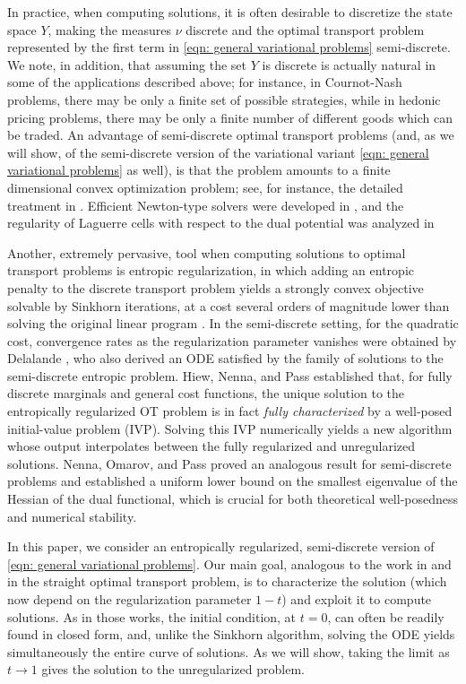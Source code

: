 \documentclass{scrartcl}
\theoremstyle{plain}
\theoremstyle{definition}
\begin{document}
In practice, when computing solutions, it is often desirable to discretize the state space $Y$, making the measures $\nu$ discrete and the optimal transport problem represented by the first term in \eqref{eqn: general variational problems} semi-discrete.  We note, in addition, that assuming the set $Y$ is discrete is actually natural in some of the applications described above; for instance, in Cournot-Nash problems, there may be only a finite set of possible strategies, while in hedonic pricing problems, there may be only a finite number of different goods which can be traded.  An advantage of semi-discrete optimal transport problems (and, as we will show, of the semi-discrete version of the variational variant \eqref{eqn: general variational problems} as well), is that the problem amounts to a finite dimensional convex optimization problem; see, for instance, the detailed treatment in \cite{MerigotThibert2021}. Efficient Newton-type solvers were developed in \cite{kitagawa2019convergence,levy2015numerical}, and the regularity of Laguerre cells with respect to the dual potential was analyzed in \cite{de2019differentiation}

Another, extremely pervasive,  tool when computing solutions to optimal transport problems is entropic regularization, in which adding an entropic penalty to the discrete transport problem yields a strongly convex objective solvable by Sinkhorn iterations, at a cost several orders of magnitude lower than solving the original linear program \cite{cuturi2013sinkhorn}. In the semi-discrete setting, for the quadratic cost, convergence rates as the regularization parameter vanishes were obtained by Delalande \cite{delalande2022nearly}, who also derived an ODE satisfied by the family of solutions to the semi-discrete entropic problem.  Hiew, Nenna, and Pass \cite{hiew2024ode,nenna2025ode} established that, for fully discrete marginals and general cost functions, the unique solution to the entropically regularized OT problem is in fact \emph{fully characterized} by a well-posed initial-value problem (IVP). Solving this IVP numerically yields a new algorithm whose output interpolates between the fully regularized and unregularized solutions. Nenna, Omarov, and Pass \cite{nenna2025characterizing} proved an analogous result for semi-discrete problems and established a uniform lower bound on the smallest eigenvalue of the Hessian of the dual functional, which is crucial for both theoretical well-posedness and numerical stability.

In this paper, we consider an entropically regularized, semi-discrete version of \eqref{eqn: general variational problems}.  Our main goal, analogous to the work in \cite{hiew2024ode} and \cite{nenna2025characterizing} in the straight optimal transport problem, is to characterize the solution (which now depend on the regularization parameter $1-t$) and exploit it to compute solutions.  As in those works, the initial condition, at $t=0$, can often be readily found in closed form, and, unlike the Sinkhorn algorithm, solving the ODE yields simultaneously the entire curve of solutions.  As we will show, taking the limit as $t \rightarrow 1$ gives the solution to the unregularized problem. 
\end{document}
